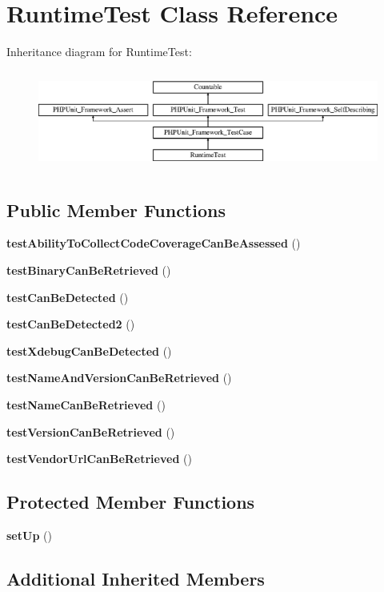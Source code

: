 \section{Runtime\+Test Class Reference}
\label{class_sebastian_bergmann_1_1_environment_1_1_runtime_test}
Inheritance diagram for Runtime\+Test\+:\begin{figure}[H]
\begin{center}
\leavevmode
\includegraphics[height=3.303835cm]{class_sebastian_bergmann_1_1_environment_1_1_runtime_test}
\end{center}
\end{figure}
\subsection*{Public Member Functions}
\begin{DoxyCompactItemize}
\item 
{\bf test\+Ability\+To\+Collect\+Code\+Coverage\+Can\+Be\+Assessed} ()
\item 
{\bf test\+Binary\+Can\+Be\+Retrieved} ()
\item 
{\bf test\+Can\+Be\+Detected} ()
\item 
{\bf test\+Can\+Be\+Detected2} ()
\item 
{\bf test\+Xdebug\+Can\+Be\+Detected} ()
\item 
{\bf test\+Name\+And\+Version\+Can\+Be\+Retrieved} ()
\item 
{\bf test\+Name\+Can\+Be\+Retrieved} ()
\item 
{\bf test\+Version\+Can\+Be\+Retrieved} ()
\item 
{\bf test\+Vendor\+Url\+Can\+Be\+Retrieved} ()
\end{DoxyCompactItemize}
\subsection*{Protected Member Functions}
\begin{DoxyCompactItemize}
\item 
{\bf set\+Up} ()
\end{DoxyCompactItemize}
\subsection*{Additional Inherited Members}


